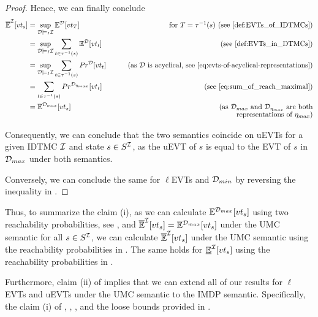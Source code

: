\begin{proof}
    Hence, we can finally conclude 
    \begin{align}
        \ExpUpper^\IMC[vt_s] 
        & = \sup_{\MC \models_I \IMC} \Exp^\MC[vt_T] \qquad & \text{for } T = \tau^{-1}(s) \text{ (see \Cref{def:EVTs_of_IDTMCs})}\notag \\
        & = \sup_{\MC \models_I \IMC} \sum_{t\in \tau^{-1}(s)}\Exp^\MC[vt_t] \qquad & \text{(see \Cref{def:EVTs_in_DTMCs})} \notag \\
        & = \sup_{\MC \models_I \IMC} \sum_{t\in \tau^{-1}(s)}Pr^\MC[vt_t] \qquad & \text{(as $\MC$ is acyclical, see \Cref{eq:evts-of-acyclical-representations})} \notag \\
        & = \sum_{t\in \tau^{-1}(s)}Pr^{\MC_{\eta_{max}}}[vt_t] \qquad & \text{(see \Cref{eq:sum_of_reach_maximal})} \notag \\
        & = \Exp^{\MC_{max}}[vt_s] \qquad & \text{(as $\MC_{max}$ and $\MC_{\eta_{max}}$ are both} \notag \\[-1ex]
        & \qquad & \text{representations of $\eta_{max}$)} \notag
    \end{align}

    Consequently, we can conclude that the two semantics coincide on uEVTs for a given IDTMC $\mathcal{I}$ and state $s \in S^{\mathcal{I}}$, as the uEVT of $s$ is equal to the EVT of $s$ in $\mathcal{D}_{max}$ under both semantics. 
    
    Conversely, we can conclude the same for $\ell$EVTs and $\mathcal{D}_{min}$ by reversing the inequality in .

\end{proof}

Thus, to summarize the claim (i), as we can calculate $\mathbb{E}^{\mathcal{D}_{max}}[vt_s]$ using two reachability probabilities, see , and $\mathbb{\overline{E}}^{\mathcal{I}}[vt_s] = \mathbb{E}^{\mathcal{D}_{max}}[vt_s]$ under the UMC semantic for all $s\in S^{\mathcal{I}}$, we can calculate $\mathbb{\overline{E}}^{\mathcal{I}}[vt_s]$ under the UMC semantic using the reachability probabilities in .
The same holds for $\mathbb{\underline{E}}^{\mathcal{I}}[vt_s]$ using the reachability probabilities in .

Furthermore, claim (ii) of  implies that we can extend all of our results for $\ell$EVTs and uEVTs under the UMC semantic to the IMDP semantic. Specifically, the claim (i) of , , , and the loose bounds provided in .

